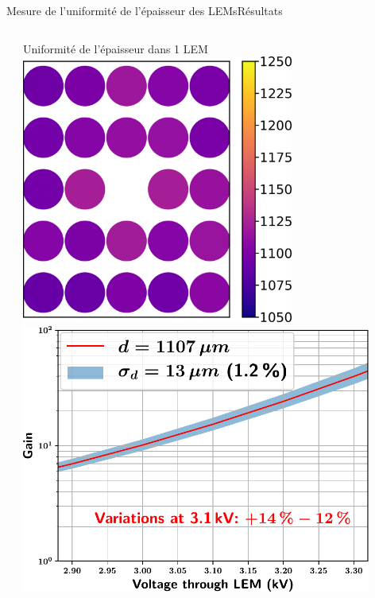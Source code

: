 \begin{frame}{Mesure de l'uniformité de l'épaisseur des LEMs}{Résultats}
\begin{scriptsize}
\begin{columns}
\begin{column}{0.48\textwidth}
    			\end{column}
    			\hfill
    			\begin{column}{0.48\textwidth}
    				\centering
    				Uniformité de l'épaisseur dans 1 LEM\\
    				\centering
    				\includegraphics[width=0.7\textwidth]{./pictures/2D_LEM_thickness_distri.png}\\
    				\vspace{0.15cm}
    				\centering
    				\includegraphics[width=0.9\textwidth]{./pictures/measured_gain_fluctuations.pdf}
    			\end{column}
    		\end{columns}
    	\end{scriptsize}
    \end{frame}

